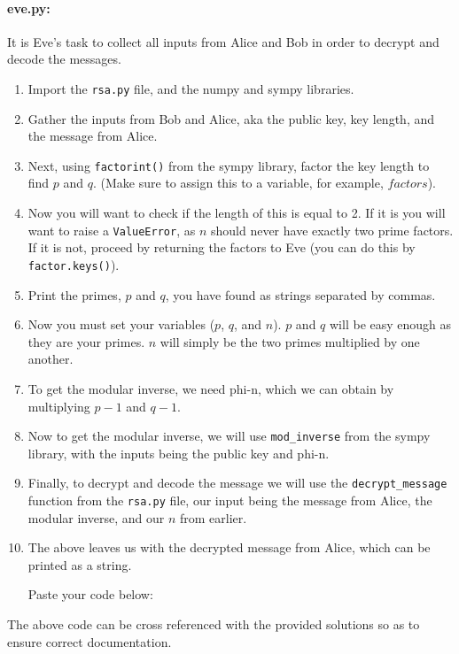 \documentclass{article}
\begin{document}
    \paragraph{eve.py:} It is Eve’s task to collect all inputs from Alice and Bob in order to decrypt and decode the messages.

    \begin{enumerate}
        \item Import the \verb|rsa.py| file, and the numpy and sympy libraries.

        \item Gather the inputs from Bob and Alice, aka the public key, key length, and the message from Alice.

        \item Next, using \verb|factorint()| from the sympy library, factor the key length to find $p$ and $q$. (Make sure to assign this to a variable, for example, $factors$).

        \item Now you will want to check if the length of this is equal to 2. If it is you will want to raise a \verb|ValueError|, as $n$ should never have exactly two prime factors. If it is not, proceed by returning the factors to Eve (you can do this by \verb|factor.keys()|).

        \item Print the primes, $p$ and $q$, you have found as strings separated by commas.

        \item Now you must set your variables ($p$, $q$, and $n$). $p$ and $q$ will be easy enough as they are your primes. $n$ will simply be the two primes multiplied by one another.

        \item To get the modular inverse, we need phi-n, which we can obtain by multiplying $p-1$ and $q-1$.

        \item Now to get the modular inverse, we will use \verb|mod_inverse| from the sympy library, with the inputs being the public key and phi-n.

        \item Finally, to decrypt and decode the message we will use the \verb|decrypt_message| function from the \verb|rsa.py| file, our input being the message from Alice, the modular inverse, and our $n$ from earlier.

        \item The above leaves us with the decrypted message from Alice, which can be printed as a string.

        Paste your code below:

            \TextField[width=6in,height=5in, bordercolor=0 0 0, name=bob2, multiline=true]{}
    \end{enumerate}

    The above code can be cross referenced with the provided solutions so as to ensure correct documentation.
\end{document}

